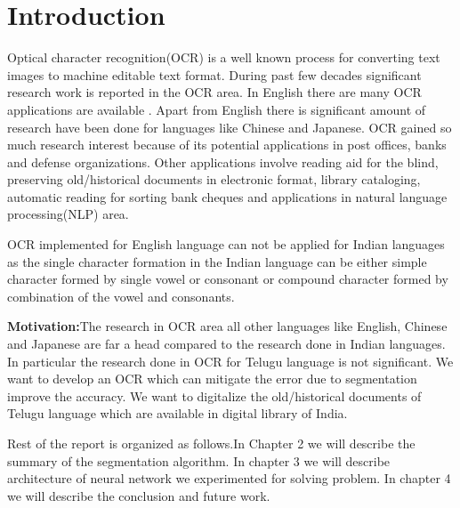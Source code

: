 
\chapter{Introduction} %

\label{Chapter1} %



Optical character recognition(OCR) is a well known process for converting text images to machine
editable text format. During past few decades significant research work is reported in the OCR area.
In English there are many  OCR applications are available . Apart from English there
is significant amount of research have been done for languages like Chinese  and Japanese.
OCR gained so much research interest because of its potential applications in post offices, banks and
defense organizations. Other applications involve reading aid for the blind, preserving old/historical
documents in electronic format, library cataloging, automatic reading for sorting bank cheques and
applications in natural language processing(NLP) area.

OCR implemented for English language can not be applied for Indian languages as the single
character formation in the Indian language can be either simple character formed by single vowel
or consonant or compound character formed by combination of the vowel and consonants.

\textbf{Motivation:}The research in OCR area all other languages like English, Chinese and Japanese
are far a head compared to the research done in Indian languages. In particular the research done
in OCR for Telugu language is not significant. We want to develop an OCR which can mitigate the error 
due to segmentation improve the accuracy. We want to
digitalize the old/historical documents of Telugu language which are available in digital library of
India.

Rest of the report is organized as follows.In Chapter 2 we will describe the summary of the segmentation 
algorithm. In chapter 3 we will describe architecture of neural network we  experimented for
solving problem. In chapter 4 we will describe the conclusion and future work.